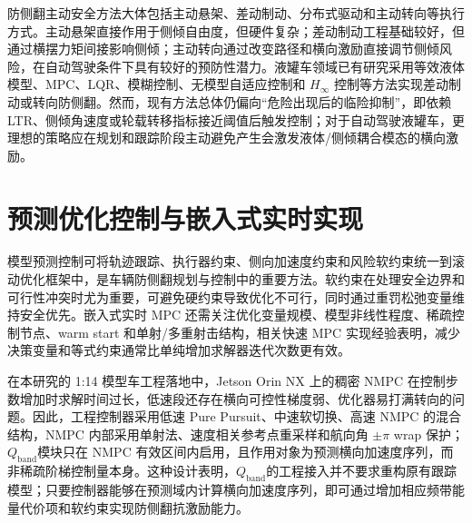 \documentclass[UTF8,zihao=-4]{ctexrep}
\newcommand{\Qband}{$Q_{\mathrm{band}}$}
\begin{document}
防侧翻主动安全方法大体包括主动悬架、差动制动、分布式驱动和主动转向等执行方式\cite{ActiveSuspension,DifferentialBrake,ActiveSteering}。主动悬架直接作用于侧倾自由度，但硬件复杂；差动制动工程基础较好，但通过横摆力矩间接影响侧倾；主动转向通过改变路径和横向激励直接调节侧倾风险，在自动驾驶条件下具有较好的预防性潜力。液罐车领域已有研究采用等效液体模型、MPC、LQR、模糊控制、无模型自适应控制和 $H_\infty$ 控制等方法实现差动制动或转向防侧翻\cite{zhaoweiqiang2018equivalent,zhaoweiqiang2019semitrailer,Reviewer2_SunWencai2022,MFAC_LiXiansheng2021,zhao2019hinfty}。然而，现有方法总体仍偏向“危险出现后的临险抑制”，即依赖 LTR、侧倾角速度或轮载转移指标接近阈值后触发控制；对于自动驾驶液罐车，更理想的策略应在规划和跟踪阶段主动避免产生会激发液体/侧倾耦合模态的横向激励。

\section{预测优化控制与嵌入式实时实现}
模型预测控制可将轨迹跟踪、执行器约束、侧向加速度约束和风险软约束统一到滚动优化框架中，是车辆防侧翻规划与控制中的重要方法\cite{Cutler1980DynamicMatrixControl,BookMPC}。软约束在处理安全边界和可行性冲突时尤为重要，可避免硬约束导致优化不可行，同时通过重罚松弛变量维持安全优先\cite{soft_constraint_Eben2010}。嵌入式实时 MPC 还需关注优化变量规模、模型非线性程度、稀疏控制节点、warm start 和单射/多重射击结构，相关快速 MPC 实现经验表明，减少决策变量和等式约束通常比单纯增加求解器迭代次数更有效\cite{EbenLi_FastMPC}。

在本研究的 1:14 模型车工程落地中，Jetson Orin NX 上的稠密 NMPC 在控制步数增加时求解时间过长，低速段还存在横向可控性梯度弱、优化器易打满转向的问题。因此，工程控制器采用低速 Pure Pursuit、中速软切换、高速 NMPC 的混合结构，NMPC 内部采用单射法、速度相关参考点重采样和航向角 $\pm\pi$ wrap 保护；\Qband 模块只在 NMPC 有效区间内启用，且作用对象为预测横向加速度序列，而非稀疏阶梯控制量本身。这种设计表明，\Qband 的工程接入并不要求重构原有跟踪模型；只要控制器能够在预测域内计算横向加速度序列，即可通过增加相应频带能量代价项和软约束实现防侧翻抗激励能力。
\end{document}
